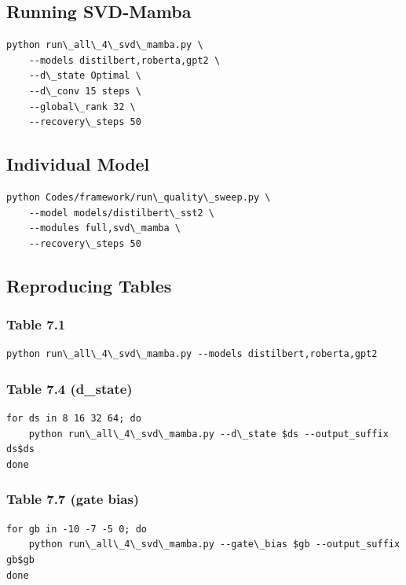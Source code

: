 \subsection{Running SVD-Mamba}

\begin{lstlisting}
python run\_all\_4\_svd\_mamba.py \
    --models distilbert,roberta,gpt2 \
    --d\_state Optimal \
    --d\_conv 15 steps \
    --global\_rank 32 \
    --recovery\_steps 50
\end{lstlisting}

\subsection{Individual Model}

\begin{lstlisting}
python Codes/framework/run\_quality\_sweep.py \
    --model models/distilbert\_sst2 \
    --modules full,svd\_mamba \
    --recovery\_steps 50
\end{lstlisting}

\subsection{Reproducing Tables}

\subsubsection{Table 7.1}
\begin{lstlisting}
python run\_all\_4\_svd\_mamba.py --models distilbert,roberta,gpt2
\end{lstlisting}

\subsubsection{Table 7.4 (d\_state)}
\begin{lstlisting}
for ds in 8 16 32 64; do
    python run\_all\_4\_svd\_mamba.py --d\_state $ds --output_suffix ds$ds
done
\end{lstlisting}

\subsubsection{Table 7.7 (gate bias)}
\begin{lstlisting}
for gb in -10 -7 -5 0; do
    python run\_all\_4\_svd\_mamba.py --gate\_bias $gb --output_suffix gb$gb
done
\end{lstlisting}


